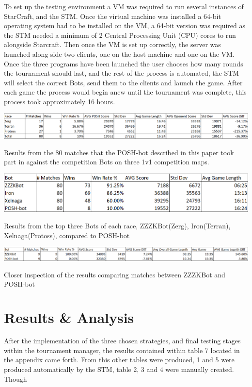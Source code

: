 \documentclass[journal]{IEEEtran}
\begin{document}
To set up the testing environment a VM was required to run several instances of StarCraft, and the STM. Once the virtual machine was installed a 64-bit operating system had to be installed on the VM, a 64-bit version was required as the STM needed a minimum of 2 Central Processing Unit (CPU) cores to run alongside Starcraft. Then once the VM is set up correctly, the server was launched along side two clients, one on the host machine and one on the VM. Once the three programs have been launched the user chooses how many rounds the tournament should last, and the rest of the process is automated, the STM will select the correct Bots, send them to the clients and launch the game. After each game the process would begin anew until the tournament was complete, this process took approximately 16 hours. 
\begin{table}[]
	\centering
	\includegraphics[width=\textwidth]{POSH-botWin}
	\caption{Results from the 80 matches that the POSH-bot described in this paper took part in against the competition Bots on three 1v1 competition maps.}
	\label{Table3}
\centering
\includegraphics[width=\textwidth]{TopThreeWin}
\caption{Results from the top three Bots of each race, ZZZKBot(Zerg), Iron(Terran), Xelnaga(Protoss), compared to POSH-bot}
\label{Table4}
\centering
\includegraphics[width=\textwidth]{PvsZ}
\caption{Closer inspection of the results comparing matches between ZZZKBot and POSH-bot}
\label{Table5}
\end{table}

\section{Results \& Analysis}
After the implementation of the three chosen strategies, and final testing stages within the tournament manager, the results contained within table 7 located in the appendix came forth. From this other tables were produced, 1 and 5 were produced automatically by the STM, table 2, 3 and 4 were manually created. Though
\end{document}
